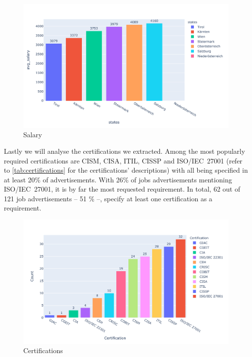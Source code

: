 \documentclass[runningheads]{llncs}
\begin{document}
\begin{figure}[H]
	\centering
  \includegraphics[width=\textwidth]{average-salary-bar-chart.pdf}
	\caption{Salary}
	\label{fig:salary_chart}
\end{figure}

Lastly we will analyse the certifications we extracted. Among the most popularly required certifications are CISM, CISA, ITIL, CISSP and ISO/IEC~27001 (refer to \autoref{tab:certifications} for the certifications' descriptions) with all being specified in at least 20\% of advertisements. With 26\% of jobs advertisements mentioning ISO/IEC~27001, it is by far the most requested requirement. In total, 62 out of 121 job advertisements -- 51 \% --, specify at least one certification as a requirement.

\begin{figure}[H]
	\centering
  \includegraphics[width=\textwidth]{certifications-bar-chart.pdf}
	\caption{Certifications}
	\label{fig:certifications_chart}
\end{figure}
\end{document}
